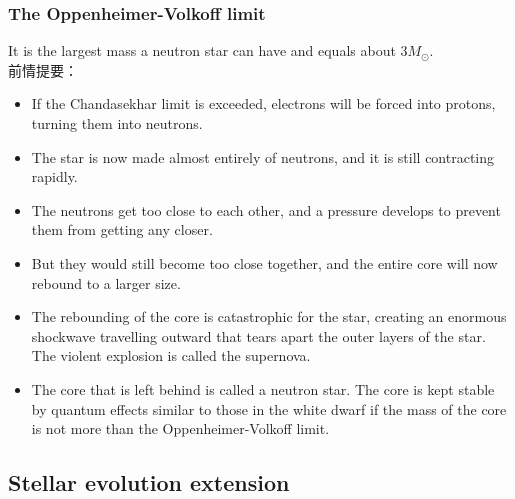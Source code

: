 \subsubsection*{The Oppenheimer-Volkoff limit}
It is the largest mass a neutron star can have and equals about $3M_\odot$.\\
前情提要：
\begin{itemize}
  \item If the Chandasekhar limit is exceeded, electrons will be forced into protons, turning them into neutrons.
  \item The star is now made almost entirely of neutrons, and it is still contracting rapidly. 
  \item The neutrons get too close to each other, and a pressure develops to prevent them from getting any closer.
  \item But they would still become too close together, and the entire core will now rebound to a larger size.
  \item The rebounding of the core is catastrophic for the star, creating an enormous shockwave travelling outward that tears apart the outer layers of the star. The violent explosion is called the supernova.
  \item The core that is left behind is called a neutron star. The core is kept stable by quantum effects similar to those in the white dwarf if the mass of the core is not more than the Oppenheimer-Volkoff limit. 
\end{itemize}
\subsection{Stellar evolution extension}
